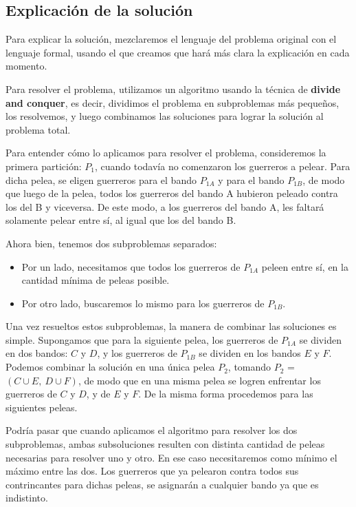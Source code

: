 \subsection{Explicación de la solución}

Para explicar la solución, mezclaremos el lenguaje del problema original con el lenguaje formal, usando el que creamos que hará más clara la explicación en cada momento.

Para resolver el problema, utilizamos un algoritmo usando la técnica de \textbf{divide and conquer}, es decir, dividimos el problema en subproblemas más pequeños, los resolvemos, y luego combinamos las soluciones para lograr la solución al problema total.

Para entender cómo lo aplicamos para resolver el problema, consideremos la primera partición: $P_1$, cuando todavía no comenzaron los guerreros a pelear.
Para dicha pelea, se eligen guerreros para el bando $P_{1A}$ y para el bando $P_{1B}$, de modo que luego de la pelea, todos los guerreros del bando A hubieron peleado contra los del B y viceversa.
De este modo, a los guerreros del bando A, les faltará solamente pelear entre sí, al igual que los del bando B.

Ahora bien, tenemos dos subproblemas separados: 
\begin{itemize}
\item Por un lado, necesitamos que todos los guerreros de $P_{1A}$ peleen entre sí, en la cantidad mínima de peleas posible.
\item Por otro lado, buscaremos lo mismo para los guerreros de $P_{1B}$.
\end{itemize}

Una vez resueltos estos subproblemas, la manera de combinar las soluciones es simple. Supongamos que para la siguiente pelea, los guerreros de $P_{1A}$ se dividen en dos bandos: $C$ y $D$, y los guerreros de $P_{1B}$ se dividen en los bandos $E$ y $F$. Podemos combinar la solución en una única pelea $P_2$, tomando $P_2$ = $(C \cup E,\ D \cup F)$, de modo que en una misma pelea se logren enfrentar los guerreros de $C$ y $D$, y de $E$ y $F$. De la misma forma procedemos para las siguientes peleas.

Podría pasar que cuando aplicamos el algoritmo para resolver los dos subproblemas, ambas subsoluciones resulten con distinta cantidad de peleas necesarias para resolver uno y otro. En ese caso necesitaremos como mínimo el máximo entre las dos. Los guerreros que ya pelearon contra todos sus contrincantes para dichas peleas, se asignarán a cualquier bando ya que es indistinto.

